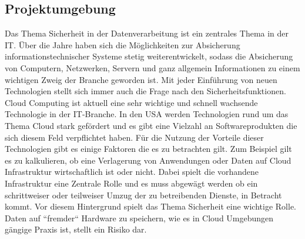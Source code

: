 \documentclass[
book,
a4paper,   
titlepage,  
halfparskip,
12pt        
]{scrartcl}
\begin{document}
\begin{onehalfspacing}
\subsection{Projektumgebung}
\label{subsec:proj}
Das Thema Sicherheit in der Datenverarbeitung ist ein zentrales Thema in der \ac{IT}. Über die Jahre haben sich die Möglichkeiten zur Absicherung informationstechnischer Systeme stetig weiterentwickelt, sodass die Absicherung von Computern, Netzwerken, Servern und ganz allgemein Informationen zu einem wichtigen Zweig der Branche geworden ist. Mit jeder Einführung von neuen Technologien stellt sich immer auch die Frage nach den Sicherheitsfunktionen.\\
Cloud Computing ist aktuell eine sehr wichtige und schnell wachsende Technologie in der \ac{IT}-Branche. In den \ac{USA} werden Technologien rund um das Thema Cloud stark gefördert und es gibt eine Vielzahl an Softwareprodukten die sich diesem Feld verpflichtet haben. Für die Nutzung der Vorteile dieser Technologien gibt es einige Faktoren die es zu betrachten gilt. Zum Beispiel gilt es zu kalkulieren, ob eine Verlagerung von Anwendungen oder Daten auf Cloud Infrastruktur wirtschaftlich ist oder nicht. Dabei spielt die vorhandene Infrastruktur eine Zentrale Rolle und es muss abgewägt werden ob ein schrittweiser oder teilweiser Umzug der zu betreibenden Dienste, in Betracht kommt. Vor diesem Hintergrund spielt das Thema Sicherheit eine wichtige Rolle. Daten auf ``fremder`` Hardware zu speichern, wie es in Cloud Umgebungen gängige Praxis ist, stellt ein Risiko dar.


\end{onehalfspacing}
\end{document}
